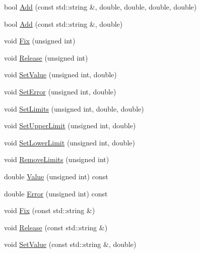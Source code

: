 \begin{DoxyCompactItemize}
bool \mbox{\hyperlink{classROOT_1_1Minuit2_1_1MnUserTransformation_a173dea97b7be768e54b669c53b92c2dc}{Add}} (const std\+::string \&, double, double, double, double)
\item 
bool \mbox{\hyperlink{classROOT_1_1Minuit2_1_1MnUserTransformation_acf1aa6f4f5c65405a3b9e700ae806e44}{Add}} (const std\+::string \&, double)
\item 
void \mbox{\hyperlink{classROOT_1_1Minuit2_1_1MnUserTransformation_ad3447936f5ae547aa3f80a76efa5e35d}{Fix}} (unsigned int)
\item 
void \mbox{\hyperlink{classROOT_1_1Minuit2_1_1MnUserTransformation_acc0c7437f21dc53d1d56d62f7a82d352}{Release}} (unsigned int)
\item 
void \mbox{\hyperlink{classROOT_1_1Minuit2_1_1MnUserTransformation_a62f598ff8d0c916c496f495440101d9c}{Set\+Value}} (unsigned int, double)
\item 
void \mbox{\hyperlink{classROOT_1_1Minuit2_1_1MnUserTransformation_a6256d78c2aafb1142eadc811ee981d79}{Set\+Error}} (unsigned int, double)
\item 
void \mbox{\hyperlink{classROOT_1_1Minuit2_1_1MnUserTransformation_ad45b1ae620fbf8ca9f77846b80cca808}{Set\+Limits}} (unsigned int, double, double)
\item 
void \mbox{\hyperlink{classROOT_1_1Minuit2_1_1MnUserTransformation_a276c83d584ef857cd2b69ecc04cfab01}{Set\+Upper\+Limit}} (unsigned int, double)
\item 
void \mbox{\hyperlink{classROOT_1_1Minuit2_1_1MnUserTransformation_a380498bdd8801393713fde4a4835402e}{Set\+Lower\+Limit}} (unsigned int, double)
\item 
void \mbox{\hyperlink{classROOT_1_1Minuit2_1_1MnUserTransformation_aa7b791dee11011a7442e44c85c06d650}{Remove\+Limits}} (unsigned int)
\item 
double \mbox{\hyperlink{classROOT_1_1Minuit2_1_1MnUserTransformation_a63d57196d60559aa9df6c9c499cd21d0}{Value}} (unsigned int) const
\item 
double \mbox{\hyperlink{classROOT_1_1Minuit2_1_1MnUserTransformation_a9d7f873342a58fe078edd10cc2175faf}{Error}} (unsigned int) const
\item 
void \mbox{\hyperlink{classROOT_1_1Minuit2_1_1MnUserTransformation_ad01d6c104e0c4a26c2ebb34db0ba1752}{Fix}} (const std\+::string \&)
\item 
void \mbox{\hyperlink{classROOT_1_1Minuit2_1_1MnUserTransformation_ac9272ca2d514e879f59b0bb7dcbf9906}{Release}} (const std\+::string \&)
\item 
void \mbox{\hyperlink{classROOT_1_1Minuit2_1_1MnUserTransformation_a30717c0bcc5206cc957e505b9cfd64fd}{Set\+Value}} (const std\+::string \&, double)

\end{DoxyCompactItemize}
